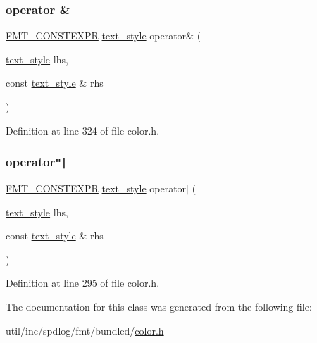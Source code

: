 \subsubsection{\texorpdfstring{operator \&}{operator \&}}
{\footnotesize\ttfamily \hyperlink{core_8h_a69201cb276383873487bf68b4ef8b4cd}{F\+M\+T\+\_\+\+C\+O\+N\+S\+T\+E\+X\+PR} \hyperlink{classtext__style}{text\+\_\+style} operator\& (\begin{DoxyParamCaption}\item[{\hyperlink{classtext__style}{text\+\_\+style}}]{lhs,  }\item[{const \hyperlink{classtext__style}{text\+\_\+style} \&}]{rhs }\end{DoxyParamCaption})\hspace{0.3cm}{\ttfamily [friend]}}



Definition at line 324 of file color.\+h.

\mbox{\label{classtext__style_a35023459e415ef79bccff971618bfc1f}} 
\subsubsection{\texorpdfstring{operator\texttt{"|}}{operator|}}
{\footnotesize\ttfamily \hyperlink{core_8h_a69201cb276383873487bf68b4ef8b4cd}{F\+M\+T\+\_\+\+C\+O\+N\+S\+T\+E\+X\+PR} \hyperlink{classtext__style}{text\+\_\+style} operator$\vert$ (\begin{DoxyParamCaption}\item[{\hyperlink{classtext__style}{text\+\_\+style}}]{lhs,  }\item[{const \hyperlink{classtext__style}{text\+\_\+style} \&}]{rhs }\end{DoxyParamCaption})\hspace{0.3cm}{\ttfamily [friend]}}



Definition at line 295 of file color.\+h.



The documentation for this class was generated from the following file\+:\begin{DoxyCompactItemize}
\item 
util/inc/spdlog/fmt/bundled/\hyperlink{color_8h}{color.\+h}\end{DoxyCompactItemize}
